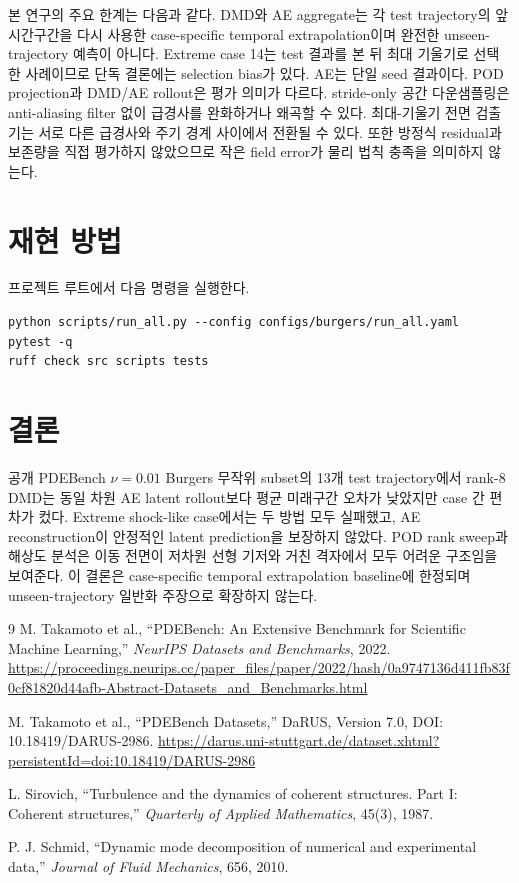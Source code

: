\documentclass[11pt,a4paper]{article}
\begin{document}
본 연구의 주요 한계는 다음과 같다. DMD와 AE aggregate는 각 test trajectory의 앞 시간구간을 다시 사용한 case-specific temporal extrapolation이며 완전한 unseen-trajectory 예측이 아니다. Extreme case 14는 test 결과를 본 뒤 최대 기울기로 선택한 사례이므로 단독 결론에는 selection bias가 있다. AE는 단일 seed 결과이다. POD projection과 DMD/AE rollout은 평가 의미가 다르다. stride-only 공간 다운샘플링은 anti-aliasing filter 없이 급경사를 완화하거나 왜곡할 수 있다. 최대-기울기 전면 검출기는 서로 다른 급경사와 주기 경계 사이에서 전환될 수 있다. 또한 방정식 residual과 보존량을 직접 평가하지 않았으므로 작은 field error가 물리 법칙 충족을 의미하지 않는다.

\section{재현 방법}

프로젝트 루트에서 다음 명령을 실행한다.
\begin{verbatim}
python scripts/run_all.py --config configs/burgers/run_all.yaml
pytest -q
ruff check src scripts tests
\end{verbatim}

\section{결론}

공개 PDEBench $\nu=0.01$ Burgers 무작위 subset의 13개 test trajectory에서 rank-8 DMD는 동일 차원 AE latent rollout보다 평균 미래구간 오차가 낮았지만 case 간 편차가 컸다. Extreme shock-like case에서는 두 방법 모두 실패했고, AE reconstruction이 안정적인 latent prediction을 보장하지 않았다. POD rank sweep과 해상도 분석은 이동 전면이 저차원 선형 기저와 거친 격자에서 모두 어려운 구조임을 보여준다. 이 결론은 case-specific temporal extrapolation baseline에 한정되며 unseen-trajectory 일반화 주장으로 확장하지 않는다.

\begin{thebibliography}{9}
M. Takamoto et al., ``PDEBench: An Extensive Benchmark for Scientific Machine Learning,'' \emph{NeurIPS Datasets and Benchmarks}, 2022. \url{https://proceedings.neurips.cc/paper_files/paper/2022/hash/0a9747136d411fb83f0cf81820d44afb-Abstract-Datasets_and_Benchmarks.html}

M. Takamoto et al., ``PDEBench Datasets,'' DaRUS, Version 7.0, DOI: 10.18419/DARUS-2986. \url{https://darus.uni-stuttgart.de/dataset.xhtml?persistentId=doi:10.18419/DARUS-2986}

L. Sirovich, ``Turbulence and the dynamics of coherent structures. Part I: Coherent structures,'' \emph{Quarterly of Applied Mathematics}, 45(3), 1987.

P. J. Schmid, ``Dynamic mode decomposition of numerical and experimental data,'' \emph{Journal of Fluid Mechanics}, 656, 2010.
\end{thebibliography}
\end{document}
